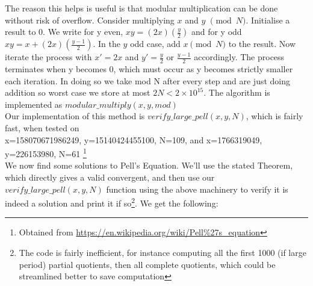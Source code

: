 \documentclass[10pt,a4paper]{report}
\begin{document}
The reason this helps is useful is that modular multiplication can be done without risk of overflow. Consider multiplying $x$ and $y$ $\pmod{N}$. Initialise a result to 0. We write for y even, $xy = (2x)(\frac{y}{2})$ and for y odd $xy = x+ (2x)(\frac{y-1}{2})$.  In the $y$ odd case, add $x \pmod{N}$ to the result. Now iterate the process with $x'=2x$ and $y'=\frac{y}{2}$ or $\frac{y-1}{2}$ accordingly. The process terminates when y becomes 0, which must occur as y becomes strictly smaller each iteration. In doing so we take mod N after every step and are just doing addition so worst case we store at most $2N < 2\times10^{15}$. The algorithm is implemented as $modular\_multiply(x,y,mod)$\\

Our implementation of this method is $verify\_large\_pell(x,y,N)$, which is fairly fast, when tested on \\ x=158070671986249, y=15140424455100, N=109, and x=1766319049, y=226153980, N=61 \footnote{Obtained from \url{https://en.wikipedia.org/wiki/Pell\%27s_equation}}\\	

We now find some solutions to Pell's Equation. We'll use the stated Theorem, which directly gives a valid convergent, and then use our $verify\_large\_pell(x,y,N)$ function using the above machinery to verify it is indeed a solution and print it if so\footnote{The code is fairly inefficient, for instance computing all the first 1000 (if large period) partial quotients, then all complete quotients, which could be streamlined better to save computation}. We get the following:
\end{document}

